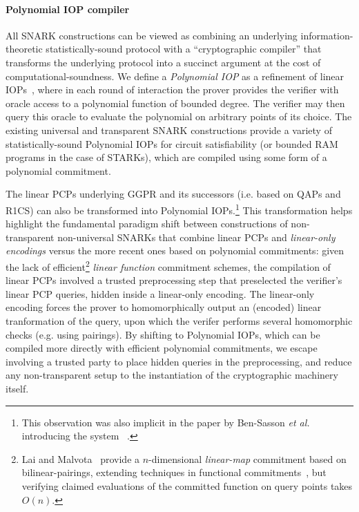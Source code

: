 \paragraph{Polynomial IOP compiler} %
All SNARK constructions can be viewed as combining an underlying information-theoretic statistically-sound protocol with a ``cryptographic compiler'' that transforms the underlying protocol into a succinct argument at the cost of computational-soundness. 
We define a \emph{Polynomial IOP} as a refinement of linear IOPs~\cite{CC:IKO07,C:BBCGI19}, where in each round of interaction the prover provides the verifier with oracle access to a polynomial function of bounded degree. The verifier may then query this oracle to evaluate the polynomial on arbitrary points of its choice. The existing universal and transparent SNARK constructions provide a variety of statistically-sound Polynomial IOPs for circuit satisfiability (or bounded RAM programs in the case of STARKs), which are compiled using some form of a polynomial commitment. 

The linear PCPs underlying GGPR and its successors (i.e. based on QAPs and R1CS) can also be transformed into Polynomial IOPs.\footnote{This observation was also implicit in the paper by Ben-Sasson \emph{et al.} introducing the system ~\cite{EC:BCRSVW19}.} This transformation helps highlight the fundamental paradigm shift between constructions of non-transparent non-universal SNARKs that combine linear PCPs and \emph{linear-only encodings} versus the more recent ones based on polynomial commitments: given the lack of efficient\footnote{Lai and Malvota~\cite{C:LaiMal19} provide a $n$-dimensional \emph{linear-map} commitment based on bilinear-pairings, extending techniques in functional commitments~\cite{ICALP:LibRamYun16}, but verifying claimed evaluations of the committed function on query points takes $O(n)$.} \emph{linear function} commitment schemes, the compilation of linear PCPs involved a trusted preprocessing step that preselected the verifier's linear PCP queries, hidden inside a linear-only encoding. The linear-only encoding forces the prover to homomorphically output an (encoded) linear tranformation of the query, upon which the verifer performs several homomorphic checks (e.g. using pairings). By shifting to Polynomial IOPs, which can be compiled more directly with efficient polynomial commitments, we escape involving a trusted party to place hidden queries in the preprocessing, and reduce any non-transparent setup to the instantiation of the cryptographic machinery itself.   

